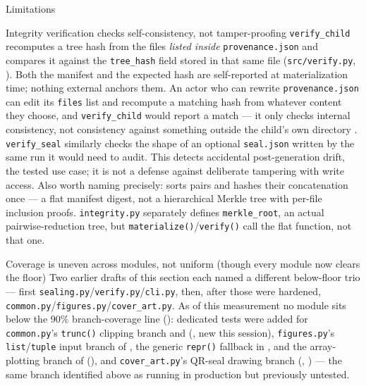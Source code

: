 \documentclass[
  ignorenonframetext,
]{beamer}
\begin{document}
\begin{frame}{Limitations}
\begin{block}{Integrity verification checks self-consistency, not
tamper-proofing}
\protect{}\label{integrity-verification-checks-self-consistency-not-tamper-proofing}
\texttt{verify\_child} recomputes a tree hash from the files
\emph{listed inside} \texttt{provenance.json} and compares it against
the \texttt{tree\_hash} field stored in that same file
(\texttt{src/verify.py}, ). Both the manifest
and the expected hash are self-reported at materialization time; nothing
external anchors them. An actor who can rewrite \texttt{provenance.json}
can edit its \texttt{files} list and recompute a matching hash from
whatever content they choose, and \texttt{verify\_child} would report a
match --- it only checks internal consistency, not consistency against
something outside the child's own directory
. \texttt{verify\_seal} similarly checks
the shape of an optional \texttt{seal.json} written by the same run it
would need to audit. This detects accidental post-generation drift, the
tested use case; it is not a defense against deliberate tampering with
write access. Also worth naming precisely:
 sorts
 pairs and hashes their concatenation once
--- a flat manifest digest, not a hierarchical Merkle tree with per-file
inclusion proofs. \texttt{integrity.py} separately defines
\texttt{merkle\_root}, an actual pairwise-reduction tree, but
\texttt{materialize()}/\texttt{verify()} call the flat function, not
that one.
\end{block}

\begin{block}{Coverage is uneven across modules, not uniform (though
every module now clears the floor)}
\protect{}\label{coverage-is-uneven-across-modules-not-uniform-though-every-module-now-clears-the-floor}
Two earlier drafts of this section each named a different below-floor
trio --- first \texttt{sealing.py}/\texttt{verify.py}/\texttt{cli.py},
then, after those were hardened,
\texttt{common.py}/\texttt{figures.py}/\texttt{cover\_art.py}. As of
this measurement no module sits below the 90\% branch-coverage line
(): dedicated tests were added for
\texttt{common.py}'s \texttt{trunc()} clipping branch and
 (, new this
session), \texttt{figures.py}'s \texttt{list}/\texttt{tuple} input
branch of , the generic
\texttt{repr()} fallback in , and the
array-plotting branch of 
(), and \texttt{cover\_art.py}'s QR-seal
drawing branch (,
) --- the same
branch identified above as running in production but previously
untested.


\end{block}
\end{frame}
\end{document}
